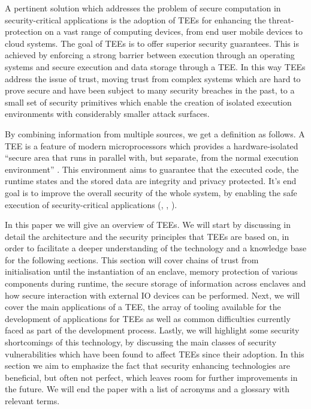 \documentclass[runningheads,a4paper]{uwsese}
\begin{document}
A pertinent solution which addresses the problem of secure computation in
security-critical applications is the adoption of \glspl{TEE} for enhancing the
threat-protection on a vast range of computing devices, from end user mobile
devices to cloud systems. The goal of \glspl{TEE} is to offer superior
security guarantees. This is achieved by enforcing a strong barrier between
execution through an operating systems and secure execution and data storage
through a \gls{TEE}. In this way \glspl{TEE} address the issue of trust, moving
trust from complex systems which are hard to prove secure and have been
subject to many security breaches in the past, to a small set of security
primitives which enable the creation of isolated execution environments with
considerably smaller attack surfaces.

By combining information from multiple sources, we get a definition as
follows. A \gls{TEE} is a feature of modern microprocessors which provides a
hardware-isolated ``secure area that runs in parallel with, but separate, from
the normal execution environment'' \cite{tee_ieee_standard}. This environment
aims to guarantee that the executed code, the runtime states and the stored
data are integrity and privacy protected. It's end goal is to improve the
overall security of the whole system, by enabling the safe execution of
security-critical applications (\cite{tee_app_rev}, \cite{tee_in_securities},
\cite{tee_is_and_not}).

In this paper we will give an overview of \glspl{TEE}. We will start by
discussing in detail the architecture and the security principles that
\glspl{TEE} are based on, in order to facilitate a deeper understanding of the
technology and a knowledge base for the following sections. This section will
cover chains of trust from initialisation until the instantiation of an
\gls{enclave}, memory protection of various components during runtime, the
secure storage of information across enclaves and how secure interaction with
external IO devices can be performed. Next, we will cover the main applications
of a \gls{TEE}, the array of tooling available for the development of
applications for \glspl{TEE} as well as common difficulties currently faced as
part of the development process. Lastly, we will highlight some security
shortcomings of this technology, by discussing the main classes of security
vulnerabilities which have been found to affect \glspl{TEE} since their
adoption. In this section we aim to emphasize the fact that security enhancing
technologies are beneficial, but often not perfect, which leaves room for
further improvements in the future. We will end the paper with a list of
acronyms and a glossary with relevant terms.
\end{document}

